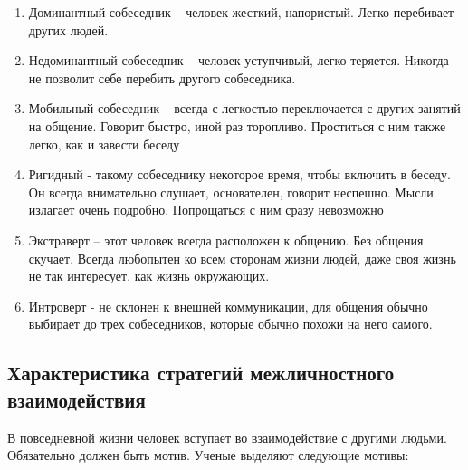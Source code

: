 \documentclass[a4paper,14pt]{extarticle}
\begin{document}
\begin{enumerate}
    \item Доминантный собеседник – человек жесткий, напористый. Легко перебивает других людей.
    \item Недоминантный собеседник – человек уступчивый, легко теряется. Никогда не позволит себе перебить другого собеседника.
    \item Мобильный собеседник – всегда с легкостью переключается с других занятий на общение. Говорит быстро, иной раз торопливо. Проститься с ним также легко, как и завести беседу
    \item Ригидный - такому собеседнику некоторое время, чтобы включить в беседу. Он всегда внимательно слушает, основателен, говорит неспешно. Мысли излагает очень подробно. Попрощаться с ним сразу невозможно
    \item Экстраверт – этот человек всегда расположен к общению. Без общения скучает. Всегда любопытен ко всем сторонам жизни людей, даже своя жизнь не так интересует, как жизнь окружающих.
    \item Интроверт - не склонен к внешней коммуникации, для общения обычно выбирает до трех собеседников, которые обычно похожи на него самого.
\end{enumerate}

\subsection{Характеристика стратегий межличностного взаимодействия}

В повседневной жизни человек вступает во взаимодействие с другими людьми. Обязательно должен быть мотив. Ученые выделяют следующие мотивы:

\begin{multienumerate}
\end{multienumerate}
\end{document}
